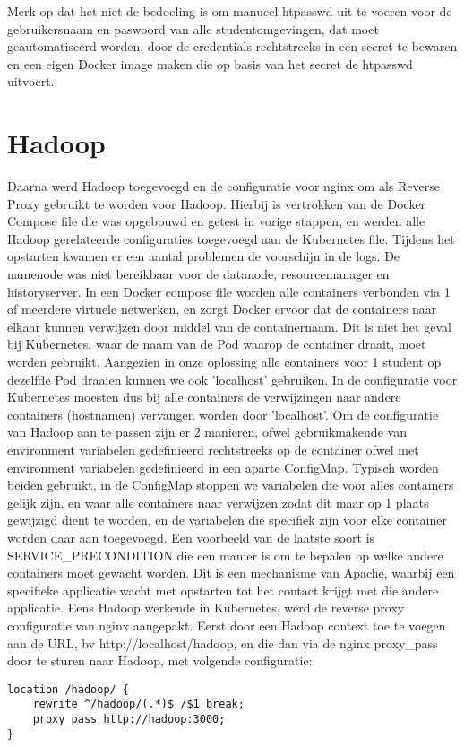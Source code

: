 Merk op dat het niet de bedoeling is om manueel htpasswd uit te voeren voor de gebruikersnaam en paswoord van alle studentomgevingen, dat moet geautomatiseerd worden, door de credentials rechtstreeks in een secret te bewaren en een eigen Docker image maken die op basis van het secret de htpasswd uitvoert.

\section{Hadoop}
Daarna werd Hadoop toegevoegd en de configuratie voor nginx om als Reverse Proxy gebruikt te worden voor Hadoop. Hierbij is vertrokken van de Docker Compose file die was opgebouwd en getest in vorige stappen, en werden alle Hadoop gerelateerde configuraties toegevoegd aan de Kubernetes file. Tijdens het opstarten kwamen er een aantal problemen de voorschijn in de logs. De namenode was niet bereikbaar voor de datanode, resourcemanager en historyserver.
In een Docker compose file worden alle containers verbonden via 1 of meerdere virtuele netwerken, en zorgt Docker ervoor dat de containers naar elkaar kunnen verwijzen door middel van de containernaam. Dit is niet het geval bij Kubernetes, waar de naam van de Pod waarop de container draait, moet worden gebruikt. Aangezien in onze oplossing alle containers voor 1 student op dezelfde Pod draaien kunnen we ook 'localhost' gebruiken.\newline
In de configuratie voor Kubernetes moesten dus bij alle containers de verwijzingen naar andere containers (hostnamen) vervangen worden door 'localhost'.
\newline
\newline
Om de configuratie van Hadoop aan te passen zijn er 2 manieren, ofwel gebruikmakende van environment variabelen gedefinieerd rechtstreeks op de container ofwel met environment variabelen gedefinieerd in een aparte ConfigMap. Typisch worden beiden gebruikt, in de ConfigMap stoppen we variabelen die voor alles containers gelijk zijn, en waar alle containers naar verwijzen zodat dit maar op 1 plaats gewijzigd dient te worden, en de variabelen die specifiek zijn voor elke container worden daar aan toegevoegd. Een voorbeeld van de laatste soort is SERVICE\_PRECONDITION die een manier is om te bepalen op welke andere containers moet gewacht worden. Dit is een mechanisme van Apache, waarbij een specifieke applicatie wacht met opstarten tot het contact krijgt met die andere applicatie.
\newline
\newline
Eens Hadoop werkende in Kubernetes, werd de reverse proxy configuratie van nginx aangepakt. Eerst door een Hadoop context toe te voegen aan de URL, bv http://localhost/hadoop, en die dan via de nginx proxy\_pass door te sturen naar Hadoop, met volgende configuratie:
\newline
\newline
\begin{lstlisting}
location /hadoop/ {
    rewrite ^/hadoop/(.*)$ /$1 break;
    proxy_pass http://hadoop:3000;
}
\end{lstlisting}

